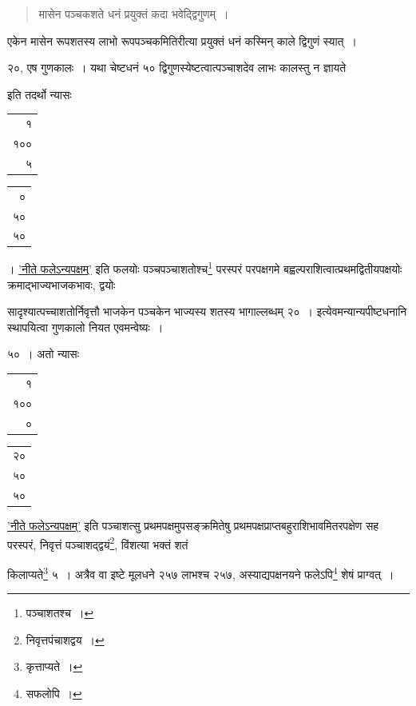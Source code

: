 \documentclass[10pt, openany]{book}
\begin{document}
{{{{\vspace{0.3cm}{उदाहरणम्\textemdash}

\begin{quote}
    {\eg  मासेन पञ्चकशते धनं प्रयुक्तं कदा भवेद्द्विगुणम्~।} \end{quote}

{एकेन मासेन रूपशतस्य लाभो रूपपञ्चकमितिरीत्या प्रयुक्तं धनं कस्मिन् काले द्विगुणं स्यात्~।}

 
\vspace{0.3cm}{कालस्य १ प्रमाणस्य १०० घातः १००, फलेन ५ भक्तः २०, गुणेन व्येकेन १ हतः}
{२०, एष गुणकालः~। यथा चेष्टधनं ५० द्विगुणस्येष्टत्वात्पञ्चाशदेव लाभः
कालस्तु न ज्ञायते}
{इति तदर्थो न्यासः\textendash \,\begin{tabular}{r|}१  \\१००  \\५ \end{tabular}\begin{tabular}{r}० \\ ५०\\ ५०\end{tabular}। \hyperref[45]{'नीते फलेऽन्यपक्षम्'} इति फलयोः
पञ्चपञ्चाशतोश्च\renewcommand{\thefootnote}{\s ६}\footnote{\s पञ्चाशतश्च~।} परस्परं परपक्षगमे बह्वल्पराशित्वात्प्रथमद्वितीयपक्षयोः
क्रमाद्भाज्यभाजकभावः, द्वयोः}
{सादृश्यात्पच्चाशतोर्निवृत्तौ भाजकेन पञ्चकेन भाज्यस्य शतस्य भागाल्लब्धम्
२०~। इत्येवमन्यान्यपीष्टधनानि स्थापयित्वा गुणकालो नियत एवमन्वेष्यः~।}

{५०~। अतो न्यासः\textendash \,\begin{tabular}{r|}१  \\१००  \\०\end{tabular}\begin{tabular}{r|}२० \\ ५०\\ ५०\end{tabular} \hyperref[45]{'नीते फलेऽन्यपक्षम्'} इति पञ्चाशत्सु
प्रथमपक्षमुपसङ्क्रमितेषु प्रथमपक्षप्राप्तबहुराशिभावमितरपक्षेण सह परस्परं, निवृत्तं
पञ्चाशद्द्वयं\renewcommand{\thefootnote}{\s ९}\footnote{\s निवृत्तपंचाशद्वय~।}, विंशत्या भक्तं शतं}
{किलाप्यते\renewcommand{\thefootnote}{\s १०}\footnote{\s कृत्ताप्यते~।} ५~। अत्रैव वा इष्टे मूलधने २५७ लाभश्च २५७,
अस्याद्यपक्षनयने फलेऽपि\renewcommand{\thefootnote}{\s ११}\footnote{\s सफलोपि~।} शेषं}
{प्राग्वत्~।}
\vspace{3mm}

}}}}
\end{document}
